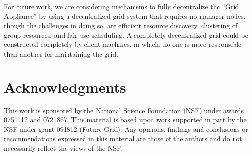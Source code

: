 \documentclass[twocolumn]{svjour3}
\begin{document}
For future work, we are considering mechanisms to fully decentralize the ``Grid
Appliance'' by using a decentralized grid system that requires no manager
nodes, though the challenges in doing so, are efficient resource discovery,
clustering of group resources, and fair use scheduling.  A completely
decentralized grid could be constructed completely by client machines, in
which, no one is more responsible than another for maintaining the grid.

\section*{Acknowledgments}

This work is sponsored by the National Science Foundation (NSF) under awards
0751112 and 0721867.  This material is based upon work supported in part by the
NSF under grant 091812 (Future Grid).  Any opinions, findings and conclusions
or recommendations expressed in this material are those of the authors and do
not necessarily reflect the views of the NSF.



\end{document}
